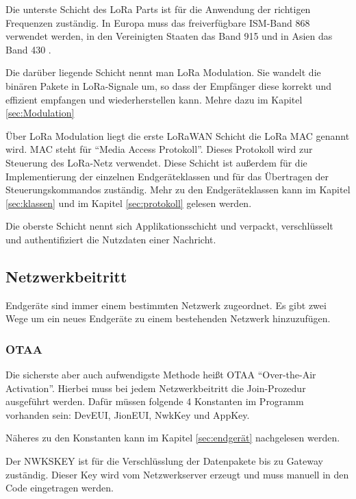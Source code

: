 \documentclass[a4paper, 12pt]{article}
\begin{document}
            Die unterste Schicht des LoRa Parts ist für die Anwendung der richtigen Frequenzen zuständig. In Europa 
            muss das freiverfügbare ISM-Band 868 verwendet werden, in den Vereinigten Staaten das Band 915 und 
            in Asien das Band 430 .\cite[S.7]{WhatIsLoRa}

            Die darüber liegende Schicht nennt man LoRa Modulation. Sie wandelt die binären Pakete in 
            LoRa-Signale um, so dass der Empfänger diese korrekt und effizient empfangen und wiederherstellen 
            kann. Mehre dazu im Kapitel  \ref{sec:Modulation} 

            Über LoRa Modulation liegt die erste LoRaWAN Schicht die LoRa MAC genannt wird. MAC steht für ``Media Access 
            Protokoll''. Dieses Protokoll wird zur Steuerung des LoRa-Netz verwendet. Diese Schicht ist außerdem für 
            die Implementierung der einzelnen Endgeräteklassen 
            und für das Übertragen der Steuerungskommandos zuständig. Mehr zu den Endgeräteklassen kann im Kapitel 
            \ref{sec:klassen}  und im Kapitel \ref{sec:protokoll}  gelesen werden.

            Die oberste Schicht nennt sich Applikationsschicht und verpackt, verschlüsselt und authentifiziert 
            die Nutzdaten einer Nachricht.
        \subsection{Netzwerkbeitritt}
            Endgeräte sind immer einem bestimmten Netzwerk zugeordnet. Es gibt zwei Wege um ein neues Endgeräte zu einem 
            bestehenden Netzwerk hinzuzufügen.
            \subsubsection{OTAA} \label{sec:OTAA}
                Die sicherste aber auch aufwendigste Methode heißt 
                OTAA ``Over-the-Air Activation''. Hierbei muss bei jedem Netzwerkbeitritt die Join-Prozedur ausgeführt
                werden. Dafür müssen folgende 4 Konstanten im Programm vorhanden sein: DevEUI, 
                JionEUI, NwkKey und AppKey.

                Näheres zu den Konstanten kann im Kapitel \ref{sec:endgerät}  nachgelesen werden.

                Der NWKSKEY ist für die Verschlüsslung der Datenpakete bis zu Gateway zuständig. Dieser Key wird 
                vom Netzwerkserver erzeugt und muss manuell in den Code eingetragen werden.\cite[S.3]{LoRaSecur}
            
\end{document}
